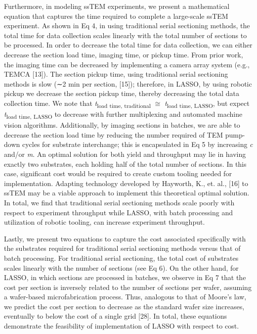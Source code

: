\documentclass{article}
\begin{document}
Furthermore, in modeling ssTEM experiments, we present a mathematical equation that captures the time required to complete a large-scale ssTEM experiment. As shown in Eq 4, in using traditional serial sectioning methods, the total time for data collection scales linearly with the total number of sections to be processed. In order to decrease the total time for data collection, we can either decrease the section load time, imaging time, or pickup time. From prior work, the imaging time can be decreased by implementing a camera array system (e.g., TEMCA [13]). The section pickup time, using traditional serial sectioning methods is slow (∼2 min per section, [15]); therefore, in LASSO, by using robotic pickup we decrease the section pickup time, thereby decreasing the total data collection time. We note that \emph{t}\textsubscript{load time, traditional} $\cong$ \emph{t}\textsubscript{load time, LASSO}, but expect \emph{t}\textsubscript{load time, LASSO} to decrease with further multiplexing and automated machine vision algorithms. Additionally, by imaging sections in batches, we are able to decrease the section load time by reducing the number required of TEM pump-down cycles for substrate interchange; this is encapsulated in Eq 5 by increasing \emph{c} and/or \emph{m}. An optimal solution for both yield and throughput may lie in having exactly two substrates, each holding half of the total number of sections. In this case, significant cost would be required to create custom tooling needed for implementation. Adapting technology developed by Hayworth, K., et. al., [16] to ssTEM may be a viable approach to implement this theoretical optimal solution. In total, we find that traditional serial sectioning methods scale poorly with respect to experiment throughput while LASSO, with batch processing and utilization of robotic tooling, can increase experiment throughput.

Lastly, we present two equations to capture the cost associated specifically with the substrates required for traditional serial sectioning methods versus that of batch processing. For traditional serial sectioning, the total cost of substrates scales linearly with the number of sections (see Eq 6). On the other hand, for LASSO, in which sections are processed in batches, we observe in Eq 7 that the cost per section is inversely related to the number of sections per wafer, assuming a wafer-based microfabrication process. Thus, analogous to that of Moore’s law, we predict the cost per section to decrease as the standard wafer size increases, eventually to below the cost of a single grid [28]. In total, these equations demonstrate the feasibility of implementation of LASSO with respect to cost.
\end{document}

